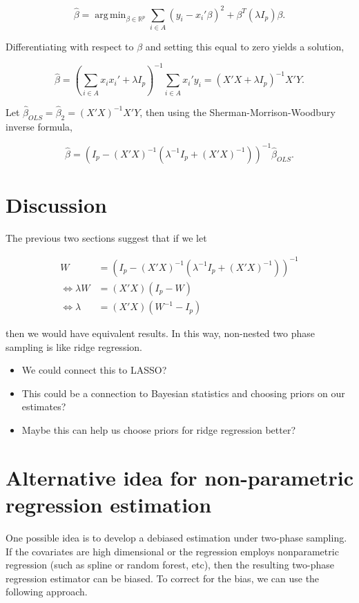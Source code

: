 \documentclass[12pt]{article}
\DeclareMathOperator*{\argmin}{arg\,min}
\newcommand{\R}{\mathbb{R}}
\begin{document}
$$\hat \beta = \argmin_{\beta \in \R^p} \sum_{i \in A} (y_i - x_i'\beta)^2 + \beta^T
(\lambda I_p) \beta.$$

Differentiating with respect to $\beta$ and setting this equal to zero yields a
solution,

$$\hat \beta = \left(\sum_{i \in A} x_i x_i' + \lambda I_p\right)^{-1} \sum_{i
\in A} x_i' y_i = (X'X + \lambda I_p)^{-1} X'Y.$$

Let $\hat \beta_{OLS} = \hat \beta_2 = (X'X)^{-1} X'Y$, then using the
Sherman-Morrison-Woodbury inverse formula,

$$\hat \beta = (I_p - (X'X)^{-1}(\lambda^{-1}I_p + (X'X)^{-1}))^{-1} \hat \beta_{OLS}.$$

\section{Discussion}

The previous two sections suggest that if we let

$$
\begin{aligned}
  W &= (I_p - (X'X)^{-1}(\lambda^{-1}I_p + (X'X)^{-1}))^{-1} \\
  \iff \lambda W &= (X'X)(I_p - W) \\ 
  \iff \lambda &= (X'X)(W^{-1} - I_p)
\end{aligned}
$$

then we would have equivalent results. In this way, non-nested two phase
sampling is like ridge regression.

\begin{itemize}
  \item We could connect this to LASSO?
  \item This could be a connection to Bayesian statistics and choosing priors on
    our estimates?
  \item Maybe this can help us choose priors for ridge regression better?
\end{itemize}


\section{Alternative idea for non-parametric regression estimation}


One possible idea is to develop a debiased estimation under two-phase sampling. If the covariates are high dimensional or the regression employs nonparametric regression (such as spline or random forest, etc), then the resulting two-phase regression estimator can be biased. To correct for the bias, we can use the following approach.
\end{document}
